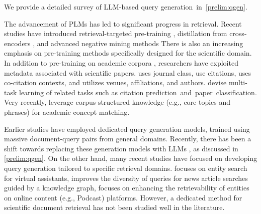 We provide a detailed survey of LLM-based query generation~in~\cref{prelim:qgen}.

The advancement of PLMs has led to significant progress in retrieval.
Recent studies have introduced retrieval-targeted pre-training \cite{CTR, condenser}, distillation from cross-encoders \cite{AR2}, and advanced negative mining methods \cite{zhan2021optimizing, rocketqa_v1}
There is also an increasing emphasis on pre-training methods specifically designed for the scientific domain. 
In addition to pre-training on academic corpora \cite{SCIBERT}, researchers have exploited metadata associated with scientific papers. 
\cite{razdaibiedina2023miread} uses journal class, \cite{SPECTER, SCINCL} use citations, \cite{ASPIRE} uses co-citation contexts, and \cite{OAGBERT} utilizes venues, affiliations, and authors.
\cite{SPECTER2, zhang2023pre} devise multi-task learning of related tasks such as citation prediction~and~paper~classification.
Very recently, \cite{ToTER, taxoindex} leverage corpus-structured knowledge (e.g., core topics and phrases) for academic concept matching.



Earlier studies \cite{nogueira2019document, nogueira2019doc2query, liang2020embedding, ma2021zero, wang2022gpl} have employed dedicated query generation models, trained using massive document-query pairs from general domains.
Recently, there has been a shift towards replacing these generation models with LLMs \cite{dai2022promptagator, inpars, inpars2, pairwise_qgen, saad2023udapdr, sachan2022improving}, as discussed in \cref{prelim:qgen}.
On the other hand, many recent studies have focused on developing query generation tailored to specific retrieval domains.
\cite{synthetic_apple_VA} focuses on entity search for virtual assistants,
\cite{shen2022diversified} improves the diversity of queries for news article searches guided by a knowledge graph,
\cite{controllable_QGen} focuses on enhancing the retrievability of entities on online content (e.g., Podcast) platforms.
However, a dedicated method for scientific document retrieval has not been studied well in the literature.

    


\vspace{-0.3cm}
 


